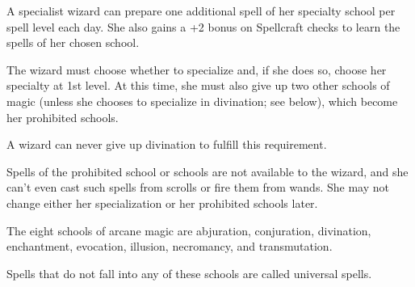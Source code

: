 A specialist wizard can prepare one additional spell of her specialty school per spell level each day. She also gains a +2 bonus on Spellcraft checks to learn the spells of her chosen school.

The wizard must choose whether to specialize and, if she does so, choose her specialty at 1st level. At this time, she must also give up two other schools of magic (unless she chooses to specialize in divination; see below), which become her prohibited schools.

A wizard can never give up divination to fulfill this requirement.

Spells of the prohibited school or schools are not available to the wizard, and she can’t even cast such spells from scrolls or fire them from wands. She may not change either her specialization or her prohibited schools later.

The eight schools of arcane magic are abjuration, conjuration, divination, enchantment, evocation, illusion, necromancy, and transmutation.

Spells that do not fall into any of these schools are called universal spells.
